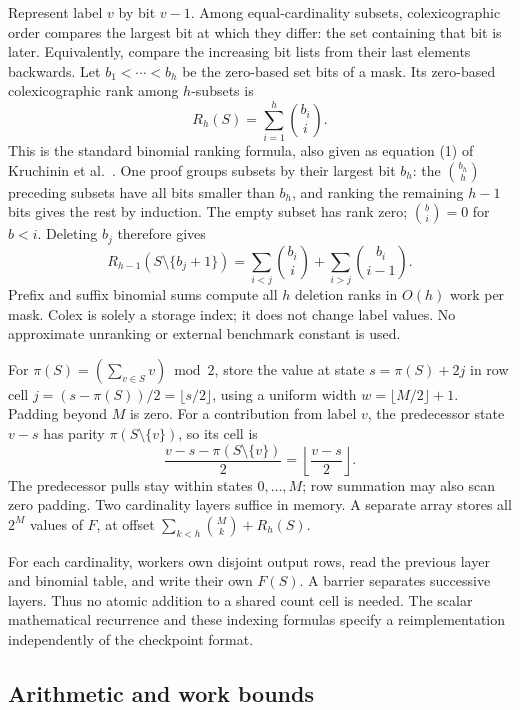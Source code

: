 \documentclass[11pt]{article}
\theoremstyle{definition}
\theoremstyle{remark}
\begin{document}
Represent label $v$ by bit $v-1$. Among equal-cardinality subsets,
colexicographic order compares the largest bit at which they differ:
the set containing that bit is later. Equivalently, compare the increasing
bit lists from their last elements backwards. Let
$b_1<\cdots<b_h$ be the zero-based set bits of a mask. Its zero-based
colexicographic rank among $h$-subsets is
\begin{equation}
 R_h(S)=\sum_{i=1}^{h}\binom{b_i}{i}.
 \label{eq:rank}
\end{equation}
This is the standard binomial ranking formula, also given as equation (1)
of Kruchinin et al.~\cite{colex}. One proof groups subsets by their largest
bit $b_h$: the $\binom{b_h}{h}$ preceding subsets have all bits smaller
than $b_h$, and ranking the remaining $h-1$ bits gives the rest by induction.
The empty subset has rank zero; $\binom bi=0$ for $b<i$.
Deleting $b_j$ therefore gives
\begin{equation}
 R_{h-1}(S\setminus\{b_j+1\})=
 \sum_{i<j}\binom{b_i}{i}+\sum_{i>j}\binom{b_i}{i-1}.
 \label{eq:delete}
\end{equation}
Prefix and suffix binomial sums compute all $h$ deletion ranks in $O(h)$
work per mask. Colex is solely a storage index; it does not change label values.
No approximate unranking or external benchmark constant is used.

For $\pi(S)=(\sum_{v\in S}v)\bmod2$, store the value at state
$s=\pi(S)+2j$ in row cell $j=(s-\pi(S))/2=\lfloor s/2\rfloor$,
using a uniform width $w=\lfloor M/2\rfloor+1$.
Padding beyond $M$ is zero. For a contribution from label $v$, the predecessor
state $v-s$ has parity $\pi(S\setminus\{v\})$, so its cell is
\[
 \frac{v-s-\pi(S\setminus\{v\})}{2}
 =\left\lfloor\frac{v-s}{2}\right\rfloor.
\]
The predecessor pulls stay within states $0,\ldots,M$; row summation may
also scan zero padding.
Two cardinality layers suffice in memory. A separate array stores all
$2^M$ values of $F$, at offset
$\sum_{k<h}\binom Mk+R_h(S)$.

For each cardinality, workers own disjoint output rows, read the previous
layer and binomial table, and write their own $F(S)$. A barrier separates
successive layers. Thus no atomic addition to a shared count cell is needed.
The scalar mathematical recurrence and these indexing formulas specify a
reimplementation independently of the checkpoint format.

\subsection{Arithmetic and work bounds}
\label{sec:arithmetic}
\end{document}
